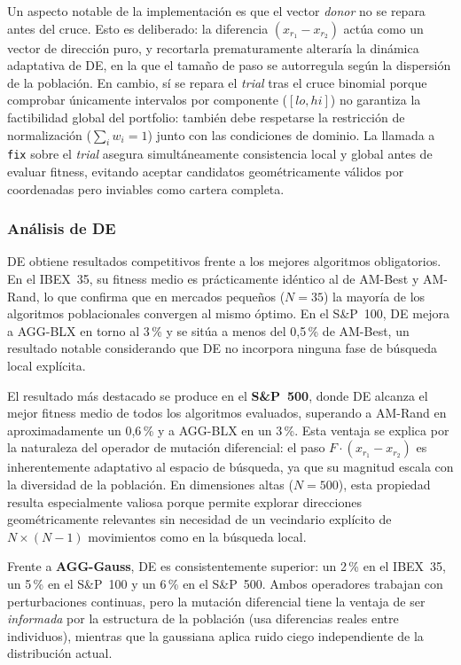 Un aspecto notable de la implementación es que el vector \textit{donor} no se repara antes del cruce. Esto es deliberado: la diferencia $(x_{r_1} - x_{r_2})$ actúa como un vector de dirección puro, y recortarla prematuramente alteraría la dinámica adaptativa de DE, en la que el tamaño de paso se autorregula según la dispersión de la población. En cambio, sí se repara el \textit{trial} tras el cruce binomial porque comprobar únicamente intervalos por componente ($[lo,hi]$) no garantiza la factibilidad global del portfolio: también debe respetarse la restricción de normalización ($\sum_i w_i = 1$) junto con las condiciones de dominio. La llamada a \texttt{fix} sobre el \textit{trial} asegura simultáneamente consistencia local y global antes de evaluar fitness, evitando aceptar candidatos geométricamente válidos por coordenadas pero inviables como cartera completa.

\subsubsection{Análisis de DE}

DE obtiene resultados competitivos frente a los mejores algoritmos obligatorios. En el IBEX~35, su fitness medio es prácticamente idéntico al de AM-Best y AM-Rand, lo que confirma que en mercados pequeños ($N=35$) la mayoría de los algoritmos poblacionales convergen al mismo óptimo. En el S\&P~100, DE mejora a AGG-BLX en torno al 3\,\% y se sitúa a menos del 0{,}5\,\% de AM-Best, un resultado notable considerando que DE no incorpora ninguna fase de búsqueda local explícita.

El resultado más destacado se produce en el \textbf{S\&P~500}, donde DE alcanza el mejor fitness medio de todos los algoritmos evaluados, superando a AM-Rand en aproximadamente un 0{,}6\,\% y a AGG-BLX en un 3\,\%. Esta ventaja se explica por la naturaleza del operador de mutación diferencial: el paso $F \cdot (x_{r_1} - x_{r_2})$ es inherentemente adaptativo al espacio de búsqueda, ya que su magnitud escala con la diversidad de la población. En dimensiones altas ($N=500$), esta propiedad resulta especialmente valiosa porque permite explorar direcciones geométricamente relevantes sin necesidad de un vecindario explícito de $N \times (N-1)$ movimientos como en la búsqueda local.

Frente a \textbf{AGG-Gauss}, DE es consistentemente superior: un 2\,\% en el IBEX~35, un 5\,\% en el S\&P~100 y un 6\,\% en el S\&P~500. Ambos operadores trabajan con perturbaciones continuas, pero la mutación diferencial tiene la ventaja de ser \textit{informada} por la estructura de la población (usa diferencias reales entre individuos), mientras que la gaussiana aplica ruido ciego independiente de la distribución actual.


